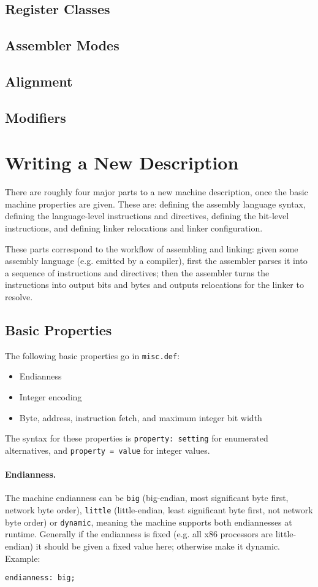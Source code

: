 \subsection{Register Classes}
\subsection{Assembler Modes}
\subsection{Alignment}
\subsection{Modifiers}


\section{Writing a New Description}

There are roughly four major parts to a new machine description, once
the basic machine properties are given.
These are: defining the assembly language syntax, defining the
language-level instructions and directives, defining the bit-level
instructions, and defining linker relocations and linker
configuration.

These parts correspond to the workflow of assembling and linking:
given some assembly language (e.g. emitted by a compiler), first the
assembler parses it into a sequence of instructions and directives;
then the assembler turns the instructions into output bits and bytes
and outputs relocations for the linker to resolve.

\subsection{Basic Properties}

The following basic properties go in \texttt{misc.def}:
\begin{itemize}
\item Endianness
\item Integer encoding
\item Byte, address, instruction fetch, and maximum integer bit width
\end{itemize}
The syntax for these properties is \texttt{property: setting}
for enumerated alternatives, and \texttt{property = value} for
integer values.

\paragraph{Endianness.} 
The machine endianness can be \texttt{big} (big-endian, most
significant byte first, network byte order), \texttt{little}
(little-endian, least significant byte first, not network byte order)
or \texttt{dynamic}, meaning the machine supports both endiannesses at
runtime.
Generally if the endianness is fixed (e.g. all x86 processors are
little-endian) it should be given a fixed value here; otherwise make
it dynamic.
Example:
\begin{verbatim}
endianness: big;
\end{verbatim}

